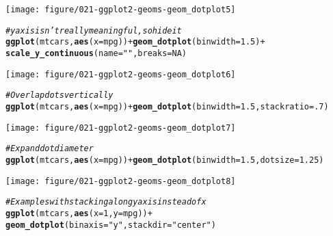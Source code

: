 \documentclass[a4paper,titlepage]{tufte-handout}\usepackage[]{graphicx}\usepackage[]{color}
\makeatletter
\def\maxwidth{ %
  \ifdim\Gin@nat@width>\linewidth
    \linewidth
  \else
    \Gin@nat@width
  \fi
}
\newcommand{\hlnum}[1]{\textcolor[rgb]{0.686,0.059,0.569}{#1}}%
\newcommand{\hlstr}[1]{\textcolor[rgb]{0.192,0.494,0.8}{#1}}%
\newcommand{\hlcom}[1]{\textcolor[rgb]{0.678,0.584,0.686}{\textit{#1}}}%
\newcommand{\hlopt}[1]{\textcolor[rgb]{0,0,0}{#1}}%
\newcommand{\hlstd}[1]{\textcolor[rgb]{0.345,0.345,0.345}{#1}}%
\newcommand{\hlkwc}[1]{\textcolor[rgb]{0.333,0.667,0.333}{#1}}%
\newcommand{\hlkwd}[1]{\textcolor[rgb]{0.737,0.353,0.396}{\textbf{#1}}}%
\newenvironment{kframe}{%
 \def\at@end@of@kframe{}%
 \ifinner\ifhmode%
  \def\at@end@of@kframe{\end{minipage}}%
  \begin{minipage}{\columnwidth}%
 \fi\fi%
 \def\FrameCommand##1{\hskip\@totalleftmargin \hskip-\fboxsep
 \colorbox{shadecolor}{##1}\hskip-\fboxsep
     \hskip-\linewidth \hskip-\@totalleftmargin \hskip\columnwidth}%
 \MakeFramed {\advance\hsize-\width
   \@totalleftmargin\z@ \linewidth\hsize
   \@setminipage}}%
 {\par\unskip\endMakeFramed%
 \at@end@of@kframe}
\newenvironment{knitrout}{}{} %
\makeatother
\begin{document}
\begin{knitrout}
\begin{kframe}
\begin{alltt}
\end{alltt}
\end{kframe}
\texttt{[image: figure/021-ggplot2-geoms-geom\_dotplot5]} 
\begin{kframe}\begin{alltt}
\hlcom{# y axis isn't really meaningful, so hide it}
\hlkwd{ggplot}\hlstd{(mtcars,} \hlkwd{aes}\hlstd{(}\hlkwc{x} \hlstd{= mpg))} \hlopt{+} \hlkwd{geom_dotplot}\hlstd{(}\hlkwc{binwidth} \hlstd{=} \hlnum{1.5}\hlstd{)} \hlopt{+}
  \hlkwd{scale_y_continuous}\hlstd{(}\hlkwc{name} \hlstd{=} \hlstr{""}\hlstd{,} \hlkwc{breaks} \hlstd{=} \hlnum{NA}\hlstd{)}
\end{alltt}


{\ttfamily\noindent\color{warningcolor}{\#\# Warning: breaks = NA is deprecated. Please use breaks = NULL to remove breaks in the scale. (Deprecated; last used in version 0.8.9)}}\end{kframe}
\texttt{[image: figure/021-ggplot2-geoms-geom\_dotplot6]} 
\begin{kframe}\begin{alltt}
\hlcom{# Overlap dots vertically}
\hlkwd{ggplot}\hlstd{(mtcars,} \hlkwd{aes}\hlstd{(}\hlkwc{x} \hlstd{= mpg))} \hlopt{+} \hlkwd{geom_dotplot}\hlstd{(}\hlkwc{binwidth} \hlstd{=} \hlnum{1.5}\hlstd{,} \hlkwc{stackratio} \hlstd{=} \hlnum{.7}\hlstd{)}
\end{alltt}
\end{kframe}
\texttt{[image: figure/021-ggplot2-geoms-geom\_dotplot7]} 
\begin{kframe}\begin{alltt}
\hlcom{# Expand dot diameter}
\hlkwd{ggplot}\hlstd{(mtcars,} \hlkwd{aes}\hlstd{(}\hlkwc{x}  \hlstd{=mpg))} \hlopt{+} \hlkwd{geom_dotplot}\hlstd{(}\hlkwc{binwidth} \hlstd{=} \hlnum{1.5}\hlstd{,} \hlkwc{dotsize} \hlstd{=} \hlnum{1.25}\hlstd{)}
\end{alltt}
\end{kframe}
\texttt{[image: figure/021-ggplot2-geoms-geom\_dotplot8]} 
\begin{kframe}\begin{alltt}
\hlcom{# Examples with stacking along y axis instead of x}
\hlkwd{ggplot}\hlstd{(mtcars,} \hlkwd{aes}\hlstd{(}\hlkwc{x} \hlstd{=} \hlnum{1}\hlstd{,} \hlkwc{y} \hlstd{= mpg))} \hlopt{+}
  \hlkwd{geom_dotplot}\hlstd{(}\hlkwc{binaxis} \hlstd{=} \hlstr{"y"}\hlstd{,} \hlkwc{stackdir} \hlstd{=} \hlstr{"center"}\hlstd{)}
\end{alltt}



\end{kframe}
\end{knitrout}
\end{document}
